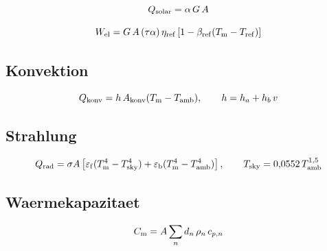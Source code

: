 \begin{equation}
  Q_\mathrm{solar} = \alpha\, G\, A
  \label{eq:qsolar}
\end{equation}

\begin{equation}
  W_\mathrm{el} = G\, A\, (\tau\alpha)\, \eta_\mathrm{ref}
         \left[ 1 - \beta_\mathrm{ref} (T_\mathrm{m} - T_\mathrm{ref}) \right]
  \label{eq:wel}
\end{equation}


\subsection{Konvektion}
\label{sec:konvektion}

\begin{equation}
  Q_\mathrm{konv} = h\, A_\mathrm{konv} (T_\mathrm{m} - T_\mathrm{amb}),
  \qquad h = h_a + h_b\, v
  \label{eq:qkonv}
\end{equation}


\subsection{Strahlung}
\label{sec:strahlung}

\begin{equation}
  Q_\mathrm{rad} = \sigma A \left[
            \varepsilon_\mathrm{f} (T_\mathrm{m}^4 - T_\mathrm{sky}^4)
          + \varepsilon_\mathrm{b} (T_\mathrm{m}^4 - T_\mathrm{amb}^4) \right],
  \qquad T_\mathrm{sky} = 0{,}0552\, T_\mathrm{amb}^{1{,}5}
  \label{eq:qrad}
\end{equation}

\subsection{Waermekapazitaet}
\label{sec:kapazitaet}

\begin{equation}
  C_\mathrm{m} = A \sum_n d_n\, \rho_n\, c_{p,n}
  \label{eq:cm}
\end{equation}


